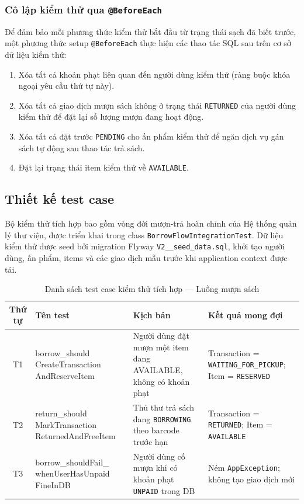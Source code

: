 \subsubsection{Cô lập kiểm thử qua \texttt{@BeforeEach}}
Để đảm bảo mỗi phương thức kiểm thử bắt đầu từ trạng thái sạch đã biết trước,
một phương thức setup \texttt{@BeforeEach} thực hiện các thao tác SQL sau trên cơ
sở dữ liệu kiểm thử:

\begin{enumerate}
    \item Xóa tất cả khoản phạt liên quan đến người dùng kiểm thử (ràng buộc
          khóa ngoại yêu cầu thứ tự này).
    \item Xóa tất cả giao dịch mượn sách không ở trạng thái \texttt{RETURNED}
          của người dùng kiểm thử để đặt lại số lượng mượn đang hoạt động.
    \item Xóa tất cả đặt trước \texttt{PENDING} cho ấn phẩm kiểm thử để ngăn
          dịch vụ gán sách tự động sau thao tác trả sách.
    \item Đặt lại trạng thái item kiểm thử về \texttt{AVAILABLE}.
\end{enumerate}

\subsection{Thiết kế test case}

Bộ kiểm thử tích hợp bao gồm vòng đời mượn-trả hoàn chỉnh của Hệ thống quản lý
thư viện, được triển khai trong class \texttt{BorrowFlowIntegrationTest}. Dữ liệu
kiểm thử được seed bởi migration Flyway \texttt{V2\_\_seed\_data.sql}, khởi tạo
người dùng, ấn phẩm, items và các giao dịch mẫu trước khi application context được
tải.

\begin{table}[h]
\centering
\caption{Danh sách test case kiểm thử tích hợp --- Luồng mượn sách}
\label{tab:integration_tests}
\begin{tabular}{|c|p{3cm}|p{4.5cm}|p{3.5cm}|}
\hline
\textbf{Thứ tự} & \textbf{Tên test} & \textbf{Kịch bản} & \textbf{Kết quả mong đợi} \\
\hline
T1 & borrow\_should CreateTransaction AndReserveItem
   & Người dùng đặt mượn một item đang AVAILABLE, không có khoản phạt
   & Transaction = \texttt{WAITING\_FOR\_PICKUP}; Item = \texttt{RESERVED} \\
\hline
T2 & return\_should MarkTransaction ReturnedAndFreeItem
   & Thủ thư trả sách đang \texttt{BORROWING} theo barcode trước hạn
   & Transaction = \texttt{RETURNED}; Item = \texttt{AVAILABLE} \\
\hline
T3 & borrow\_shouldFail\_ whenUserHasUnpaid FineInDB
   & Người dùng cố mượn khi có khoản phạt \texttt{UNPAID} trong DB
   & Ném \texttt{AppException}; không tạo giao dịch mới \\
\hline
\end{tabular}
\end{table}

